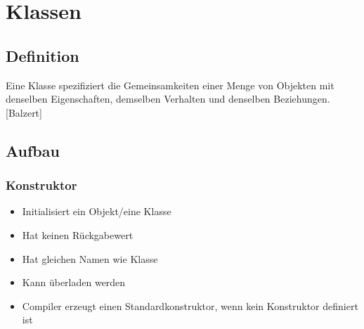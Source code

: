 \section{Klassen}

\subsection{Definition}
Eine Klasse spezifiziert die Gemeinsamkeiten einer Menge von Objekten mit denselben Eigenschaften, 
demselben Verhalten und denselben Beziehungen. [Balzert]


\begin{minipage}[t]{0.5\columnwidth}
    \subsection{Aufbau}
    
\end{minipage}\hfill%
\begin{minipage}[t]{0.49\columnwidth}
    \subsubsection{Konstruktor}
    \raggedright%
    \begin{itemize}
        \item Initialisiert ein Objekt/eine Klasse
        \item Hat keinen Rückgabewert
        \item Hat gleichen Namen wie Klasse
        \item Kann überladen werden
        \item Compiler erzeugt einen Standardkonstruktor, wenn kein Konstruktor definiert ist
    \end{itemize}
\end{minipage}


